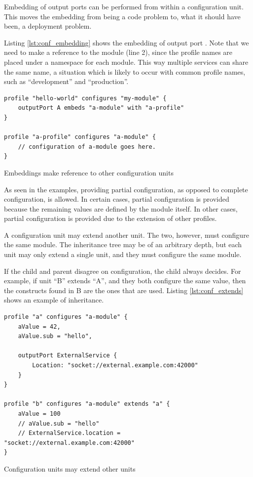 Embedding of output ports can be performed from within a configuration unit.
This moves the embedding from being a code problem to, what it should have
been, a deployment problem.

Listing \ref{lst:conf_embedding} shows the embedding of output port .
Note that we need to make a reference to the module (line 2), since the profile
names are placed under a namespace for each module. This way multiple services
can share the same name, a situation which is likely to occur with common
profile names, such as ``development'' and ``production''.

\begin{listing}[H]
\begin{verbatim}
profile "hello-world" configures "my-module" {
    outputPort A embeds "a-module" with "a-profile"
}

profile "a-profile" configures "a-module" {
    // configuration of a-module goes here.
}
\end{verbatim}
\caption{Embeddings make reference to other configuration units}
\label{lst:conf_embedding}
\end{listing}

As seen in the examples, providing partial configuration, as opposed to
complete configuration, is allowed. In certain cases, partial configuration is
provided because the remaining values are defined by the module itself. In
other cases, partial configuration is provided due to the extension of other
profiles.

A configuration unit may extend another unit. The two, however, must configure
the same module. The inheritance tree may be of an arbitrary depth, but
each unit may only extend a single unit, and they must configure the same
module.

If the child and parent disagree on configuration, the child always decides.
For example, if unit ``B'' extends ``A'', and they both configure the same
value, then the constructs found in B are the ones that are used. Listing
\ref{lst:conf_extends} shows an example of inheritance.

\begin{listing}[H]
\begin{verbatim}
profile "a" configures "a-module" {
    aValue = 42,
    aValue.sub = "hello",

    outputPort ExternalService {
        Location: "socket://external.example.com:42000"
    }
}

profile "b" configures "a-module" extends "a" {
    aValue = 100
    // aValue.sub = "hello"
    // ExternalService.location = "socket://external.example.com:42000"
}
\end{verbatim}
\caption{Configuration units may extend other units}
\label{lst:conf_extends}
\end{listing}

